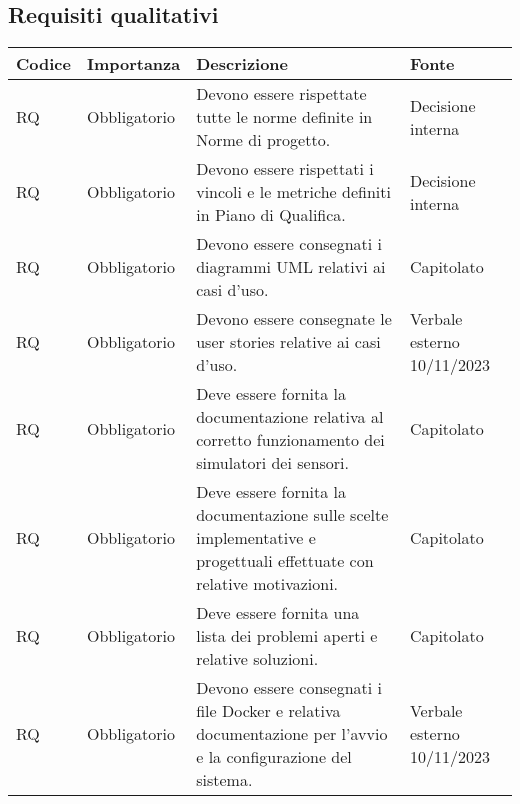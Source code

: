 \subsection{Requisiti qualitativi}
\setcounter{rowcounter}{0}
\begin{longtable}{|C{1.5cm}|C{2cm}|L{5cm}|C{2cm}|}
    \hline
    \textbf{Codice} & \textbf{Importanza} & \textbf{Descrizione} & \textbf{Fonte} \\

    \hline
     RQ & Obbligatorio & Devono essere rispettate tutte le norme definite in Norme di progetto. & Decisione interna \\

    \hline
     RQ & Obbligatorio & Devono essere rispettati i vincoli e le metriche definiti in Piano di Qualifica. & Decisione interna \\

    \hline
     RQ & Obbligatorio & Devono essere consegnati i diagrammi UML relativi ai casi d'uso. & Capitolato \\

    \hline
     RQ & Obbligatorio & Devono essere consegnate le user stories relative ai casi d'uso. & Verbale esterno 10/11/2023 \\

    \hline
     RQ & Obbligatorio & Deve essere fornita la documentazione relativa al corretto funzionamento dei simulatori dei sensori. & Capitolato \\

    \hline
     RQ & Obbligatorio & Deve essere fornita la documentazione sulle scelte implementative e progettuali effettuate con relative motivazioni. & Capitolato \\

    \hline
     RQ & Obbligatorio & Deve essere fornita una lista dei problemi aperti e relative soluzioni. & Capitolato \\

    \hline
     RQ & Obbligatorio & Devono essere consegnati i file Docker e relativa documentazione per l'avvio e la configurazione del sistema. & Verbale esterno 10/11/2023 \\


\end{longtable}
